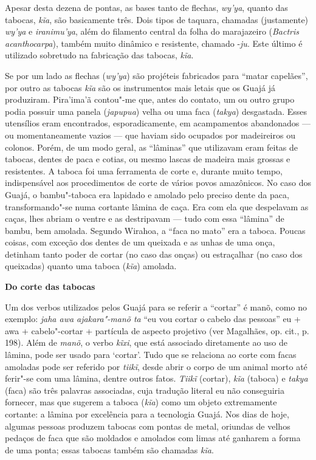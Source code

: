 Apesar desta dezena de pontas, as bases tanto de flechas, \emph{wy'ya},
quanto das tabocas, \emph{kĩa}, são basicamente três. Dois tipos de
taquara, chamadas (justamente) \emph{wy'ya} e \emph{iranimu'ya}, além do
filamento central da folha do marajazeiro (\emph{Bactris acanthocarpa}),
também muito dinâmico e resistente, chamado -\emph{ju}. Este último é
utilizado sobretudo na fabricação das tabocas, \emph{kĩa}.

Se por um lado as flechas (\emph{wy'ya}) são projéteis fabricados para
``matar capelães'', por outro as tabocas \emph{kĩa} são os instrumentos
mais letais que os Guajá já produziram. Pira'ima'ã contou"-me que, antes
do contato, um ou outro grupo podia possuir uma panela (\emph{japupua})
velha ou uma faca (\emph{takya}) desgastada. Esses utensílios eram
encontrados, esporadicamente, em acampamentos abandonados --- ou
momentaneamente vazios --- que haviam sido ocupados por madeireiros ou
colonos. Porém, de um modo geral, as ``lâminas'' que utilizavam eram
feitas de tabocas, dentes de paca e cotias, ou mesmo lascas de madeira
mais grossas e resistentes. A taboca foi uma ferramenta de corte e,
durante muito tempo, indispensável aos procedimentos de corte de vários
povos amazônicos. No caso dos Guajá, o bambu"-taboca era lapidado e
amolado pelo preciso dente da paca, transformando"-se numa cortante
lâmina de caça. Era com ela que despelavam as caças, lhes abriam o
ventre e as destripavam --- tudo com essa ``lâmina'' de bambu, bem amolada.
Segundo Wirahoa, a ``faca no mato'' era a taboca. Poucas coisas, com
exceção dos dentes de um queixada e as unhas de uma onça, detinham tanto
poder de cortar (no caso das onças) ou estraçalhar (no caso dos
queixadas) quanto uma taboca (\emph{kĩa}) amolada.

\textbf{Do corte das tabocas}

Um dos verbos utilizados pelos Guajá para se referir a ``cortar'' é
manõ, como no exemplo: \emph{jaha awa ajakara"-manõ ta} ``eu vou cortar o
cabelo das pessoas'' eu + awa + cabelo"-cortar + partícula de aspecto
projetivo (ver Magalhães, op. cit., p. 198). Além de \emph{manõ}, o
verbo \emph{kĩxi}, que está associado diretamente ao uso de lâmina, pode
ser usado para `cortar'. Tudo que se relaciona ao corte com facas
amoladas pode ser referido por \emph{tiikĩ}, desde abrir o corpo de um
animal morto até ferir"-se com uma lâmina, dentre outros fatos.
\emph{Tiikĩ} (cortar), \emph{kĩa} (taboca) e \emph{takya} (faca) são
três palavras associadas, cuja tradução literal eu não conseguiria
fornecer, mas que sugerem a taboca (\emph{kĩa}) como um objeto
extremamente cortante: a lâmina por excelência para a tecnologia Guajá.
Nos dias de hoje, algumas pessoas produzem tabocas com pontas de metal,
oriundas de velhos pedaços de faca que são moldados e amolados com limas
até ganharem a forma de uma ponta; essas tabocas também são chamadas
\emph{kĩa}.

